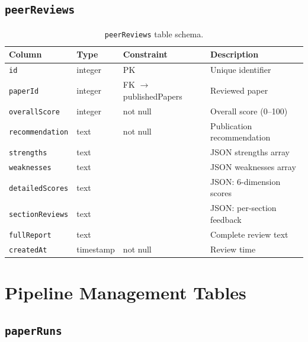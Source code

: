 \subsection{\texttt{peerReviews}}

\begin{longtable}{lllp{4cm}}
\caption{\texttt{peerReviews} table schema.} \label{tab:schema-reviews} \\
\toprule
\textbf{Column} & \textbf{Type} & \textbf{Constraint} & \textbf{Description} \\
\midrule
\endfirsthead
\texttt{id} & integer & PK & Unique identifier \\
\texttt{paperId} & integer & FK $\to$ publishedPapers & Reviewed paper \\
\texttt{overallScore} & integer & not null & Overall score (0--100) \\
\texttt{recommendation} & text & not null & Publication recommendation \\
\texttt{strengths} & text & & JSON strengths array \\
\texttt{weaknesses} & text & & JSON weaknesses array \\
\texttt{detailedScores} & text & & JSON: 6-dimension scores \\
\texttt{sectionReviews} & text & & JSON: per-section feedback \\
\texttt{fullReport} & text & & Complete review text \\
\texttt{createdAt} & timestamp & not null & Review time \\
\bottomrule
\end{longtable}

\section{Pipeline Management Tables}
\label{sec:schema:pipeline}

\subsection{\texttt{paperRuns}}

